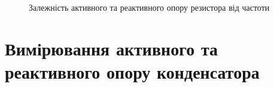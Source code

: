 \begin{figure}[h]
    \begin{minipage}[h]{0.47\linewidth}
         \\
    \end{minipage}
    \hfill
    \begin{minipage}[h]{0.47\linewidth}
        \\
    \end{minipage}
    \caption{Залежність активного та реактивного опору резистора від частоти}
    \label{fig:part221}
\end{figure}


\section{Вимірювання активного та реактивного опору конденсатора}

